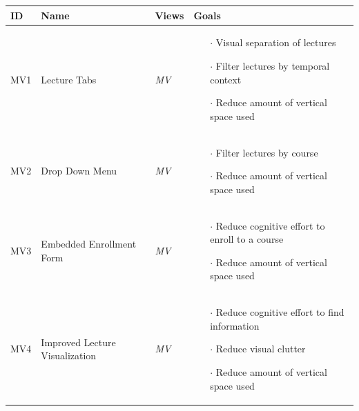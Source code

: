 \cleardoublepage
\renewcommand*{\arraystretch}{1.5}
\begin{small}
	\begin{longtable}{ p{0.7cm} p{3.8cm} p{1cm} p{6.6cm}}
		\hline
		ID & Name & Views & Goals \\ \hline
		MV1 & Lecture Tabs & \emph{MV}& 
		\vspace{-0.45cm}
		\begin{itemize}[leftmargin=*, noitemsep, topsep=0pt,  partopsep=0pt]
			\item[$\cdot$] Visual separation of lectures
			\item[$\cdot$] Filter lectures by temporal context
			\item[$\cdot$] Reduce amount of vertical space used
		\end{itemize} \vspace{-0.45cm} \\ 
		MV2 & Drop Down Menu & \emph{MV} & 
		\vspace{-0.45cm}
		\begin{itemize}[leftmargin=*, noitemsep, topsep=0pt]
			\item[$\cdot$] Filter lectures by course
			\item[$\cdot$] Reduce amount of vertical space used
		\end{itemize} \vspace{-0.45cm} \\ 
		MV3 & Embedded Enrollment Form &\emph{MV} &
		\vspace{-0.45cm}
		\begin{itemize}[leftmargin=*, noitemsep, topsep=0pt]
			\item[$\cdot$] Reduce cognitive effort to enroll to a course
			\item[$\cdot$] Reduce amount of vertical space used
		\end{itemize} \vspace{-0.45cm} \\ 
		MV4 & Improved Lecture Visualization &\emph{MV} &
		\vspace{-0.45cm}	
		\begin{itemize}[leftmargin=*, noitemsep, topsep=0pt]
			\item[$\cdot$] Reduce cognitive effort to find information
			\item[$\cdot$] Reduce visual clutter
			\item[$\cdot$] Reduce amount of vertical space used
		\end{itemize} \vspace{-0.45cm} \\ 

\end{longtable}
\end{small}
